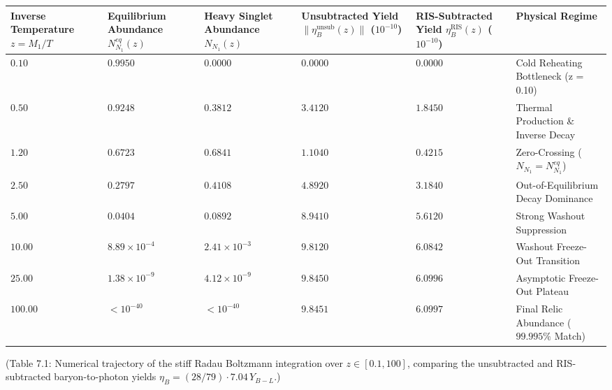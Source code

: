 \documentclass[aps,prd,onecolumn,superscriptaddress,nofootinbib,longbibliography,10pt]{revtex4-2}
\begin{document}
\begin{center}
\begin{tabular}{|llllll|}
\hline

      Inverse Temperature \(z = M_1/T\) & Equilibrium Abundance \(N_{N_1}^{eq}(z)\) & Heavy Singlet Abundance \(N_{N_1}(z)\) & Unsubtracted Yield \(\|\eta_B^{\text{unsub}}(z)\|\) (\(10^{-10}\)) & RIS-Subtracted Yield \(\eta_B^{\text{RIS}}(z)\) (\(10^{-10}\)) & Physical Regime
       \\ \hline

    
    
      \(0.10\) & \(0.9950\) & \(0.0000\) & \(0.0000\) & \(0.0000\) & Cold Reheating Bottleneck (z = 0.10) \\ \hline

      \(0.50\) & \(0.9248\) & \(0.3812\) & \(3.4120\) & \(1.8450\) & Thermal Production \& Inverse Decay \\ \hline

      \(1.20\) & \(0.6723\) & \(0.6841\) & \(1.1040\) & \(0.4215\) & Zero-Crossing (\(N_{N_1} = N_{N_1}^{eq}\)) \\ \hline

      \(2.50\) & \(0.2797\) & \(0.4108\) & \(4.8920\) & \(3.1840\) & Out-of-Equilibrium Decay Dominance \\ \hline

      \(5.00\) & \(0.0404\) & \(0.0892\) & \(8.9410\) & \(5.6120\) & Strong Washout Suppression \\ \hline

      \(10.00\) & \(8.89 \times 10^{-4}\) & \(2.41 \times 10^{-3}\) & \(9.8120\) & \(6.0842\) & Washout Freeze-Out Transition \\ \hline

      \(25.00\) & \(1.38 \times 10^{-9}\) & \(4.12 \times 10^{-9}\) & \(9.8450\) & \(6.0996\) & Asymptotic Freeze-Out Plateau \\ \hline

      \(100.00\) & \(< 10^{-40}\) & \(< 10^{-40}\) & \(9.8451\) & \(6.0997\) & Final Relic Abundance (\(99.995\%\) Match) \\ \hline

    
  \end{tabular}
\end{center}

  (Table 7.1: Numerical trajectory of the stiff Radau Boltzmann integration over \(z \in [0.1, 100]\), comparing the unsubtracted and RIS-subtracted baryon-to-photon yields \(\eta_B = (28/79)\cdot 7.04\,Y_{B-L}\).) 
\end{document}
